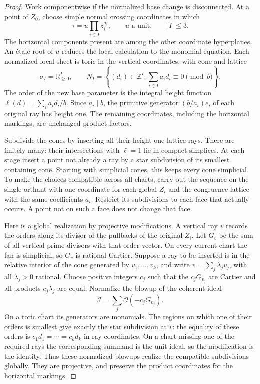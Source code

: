 \begin{proof}
Work componentwise if the normalized base change is disconnected.
At a point of $Z_0$, choose simple normal crossing coordinates in
which
\[
 \tau=u\prod_{i\in I}z_i^{a_i},
 \qquad u\text{ a unit},\qquad |I|\le3.
\]
The horizontal components present are among the other coordinate
hyperplanes.  An \'etale root of $u$ reduces the local calculation
to the monomial equation.  Each normalized local sheet is toric in
the vertical coordinates, with cone and lattice
\[
 \sigma_I=\mathbb R_{\ge0}^{I},\qquad
 N_I=\left\{(d_i)\in\mathbb Z^{I}:
                \sum_{i\in I}a_id_i\equiv0\pmod b\right\}.
\]
The order of the new base parameter is the integral height function
$\ell(d)=\sum_i a_id_i/b$.  Since $a_i\mid b$, the primitive
generator $(b/a_i)e_i$ of each original ray has height one.
The remaining coordinates, including the horizontal markings, are
unchanged product factors.

Subdivide the cones by inserting all their height-one lattice rays.
There are finitely many: their intersections with $\ell=1$ lie in
compact simplices.  At each stage insert a point not already a ray
by a star subdivision of its smallest containing cone.  Starting
with simplicial cones, this keeps every cone simplicial.  To make
the choices compatible across all charts, carry out the sequence on
the single orthant with one coordinate for each global $Z_i$ and
the congruence lattice with the same coefficients $a_i$.  Restrict
its subdivisions to each face that actually occurs.  A point not
on such a face does not change that face.

Here is a global realization by projective modifications.  A vertical
ray $v$ records the orders along its divisor of the pullbacks of the
original $Z_i$.  Let $G_v$ be the sum of all vertical prime divisors
with that order vector.  On every current chart the fan is simplicial,
so $G_v$ is rational Cartier.  Suppose a ray to be inserted is in
the relative interior of the cone generated by $v_1,\ldots,v_k$,
and write $v=\sum_j\lambda_jv_j$, with all $\lambda_j>0$ rational.
Choose positive integers $c_j$ such that the $c_jG_{v_j}$ are
Cartier and all products $c_j\lambda_j$ are equal.  Normalize the
blowup of the coherent ideal
\[
 \mathcal I=\sum_j\mathcal O(-c_jG_{v_j}).
\]
On a toric chart its generators are monomials.  The regions on which
one of their orders is smallest give exactly the star subdivision
at $v$: the equality of these orders is
$c_1d_1=\cdots=c_kd_k$ in ray coordinates.  On a chart missing one
of the required rays the corresponding summand is the unit ideal,
so the modification is the identity.  Thus these normalized blowups
realize the compatible subdivisions globally.  They are projective,
and preserve the product coordinates for the horizontal markings.


\end{proof}
